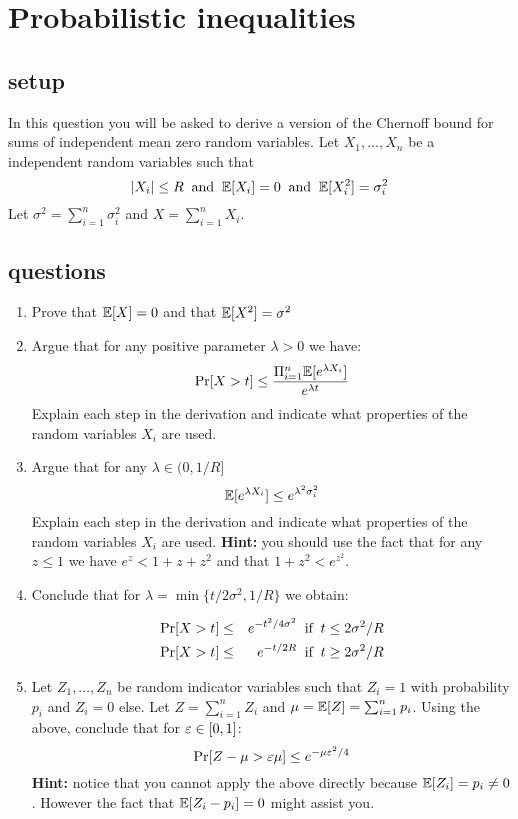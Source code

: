 \documentclass{article}
\begin{document}
\pagebreak




\section{Probabilistic inequalities}
\subsection*{setup}
In this question you will be asked to derive a version of the Chernoff bound for sums of independent mean zero random variables.
Let $X_1,\ldots,X_n$ be a independent random variables such that 
\[
|X_i| \le R \mbox{\;\;and\;\;} {\mathbb E}[X_i] = 0 \mbox{\;\;and\;\;} {\mathbb E}[X_i^2] = \sigma^2_i
\]
Let $\sigma^2 = \sum_{i=1}^{n}\sigma^2_i$ and $X = \sum_{i=1}^{n}X_i$.

\subsection*{questions}
\begin{enumerate}
\item Prove that ${\mathbb E}[X] = 0$ and that ${\mathbb E}[X^2] = \sigma^2$
\item Argue that for any positive parameter $\lambda >  0$ we have:
\[
\Pr[X > t] \le \frac{\Pi_{i=1}^{n}{\mathbb E}[e^{\lambda X_i}]}{e^{\lambda t}}
\]
Explain each step in the derivation and indicate what properties of the random variables $X_i$ are used.

\item Argue that for any $\lambda \in (0,1/R]$
\[
{\mathbb E}[e^{\lambda X_i}] \le e^{\lambda^2\sigma_i^2}
\]
Explain each step in the derivation and indicate what properties of the random variables $X_i$ are used.
{\bf Hint:} you should use the fact that for any $z \le 1$ we have $e^z < 1 + z + z^2$ and that $1+z^2 < e^{z^2}$.
\item Conclude that for $\lambda = \min\{t/2\sigma^2, 1/R\}$ we obtain:

\begin{eqnarray}
\Pr[X > t] &\le& e^{-t^2/4\sigma^2} \mbox{\;\;if\;\;} t \le  2\sigma^2/R \\
\Pr[X > t] &\le& e^{-t/2R } \mbox{\;\;if\;\;} t \ge 2\sigma^2/R
\end{eqnarray}

\item Let $Z_1,\ldots,Z_n$ be random indicator variables such that $Z_i = 1$ with probability $p_i$ and $Z_i = 0$ else.
Let $Z = \sum_{i=1}^{n} Z_i$ and $\mu = {\mathbb E}[Z] = \sum_{i=1}^{n}p_i$. Using the above, conclude that for $\varepsilon \in [0,1]$:
\[
\Pr[Z - \mu > \varepsilon \mu] \le e^{-\mu \varepsilon^2 / 4} 
\]
{\bf Hint:} notice that you cannot apply the above directly because ${\mathbb E}[Z_i] = p_i \ne 0$. However the fact that ${\mathbb E}[Z_i - p_i] = 0$ might assist you.


\end{enumerate}
\pagebreak
\end{document}
